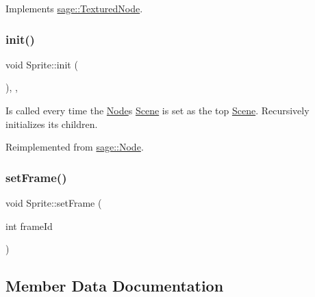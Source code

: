 Implements \mbox{\hyperlink{classsage_1_1TexturedNode_a079cea0b12a1d0e3ea69459546736c0f}{sage\+::\+Textured\+Node}}.

\mbox{\label{classsage_1_1Sprite_aeaf5c7aa5aeff1b0a4da9e66430f1c42}} 
\subsubsection{\texorpdfstring{init()}{init()}}
{\footnotesize\ttfamily void Sprite\+::init (\begin{DoxyParamCaption}{ }\end{DoxyParamCaption})\hspace{0.3cm}{\ttfamily [override]}, {\ttfamily [protected]}, {\ttfamily [virtual]}}



Is called every time the \mbox{\hyperlink{classsage_1_1Node}{Node}}\textquotesingle{}s \mbox{\hyperlink{classsage_1_1Scene}{Scene}} is set as the top \mbox{\hyperlink{classsage_1_1Scene}{Scene}}. Recursively initializes its children. 



Reimplemented from \mbox{\hyperlink{classsage_1_1Node_ab87776adae83149e235e37ed469f4e10}{sage\+::\+Node}}.

\mbox{\label{classsage_1_1Sprite_ada2cb241cf1fc71378372d04f19926e2}} 
\subsubsection{\texorpdfstring{setFrame()}{setFrame()}}
{\footnotesize\ttfamily void Sprite\+::set\+Frame (\begin{DoxyParamCaption}\item[{int}]{frame\+Id }\end{DoxyParamCaption})}



\subsection{Member Data Documentation}
\mbox{\label{classsage_1_1Sprite_aae69224b9c75eb83097f02d484975f68}} 
